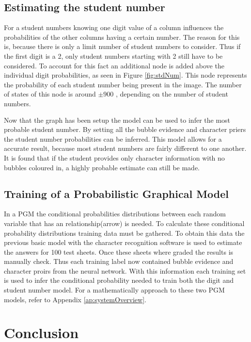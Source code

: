 \subsection{Estimating the student number}
\label{sec:studentNumber}

For a student numbers knowing one digit value of a column influences the probabilities of the other columns having a certain number. The reason for this is, because there is only a limit number of student numbers to consider. Thus if the first digit is a 2, only student numbers starting with 2 still have to be considered. To account for this fact an additional node is added above the individual digit probabilities, as seen in Figure \ref{fig:stdNum}. This node represents the probability of each student number being present in the image. The number of states of this node is around $\pm 900$ , depending on the number of student numbers.

Now that the graph has been setup the model can be used to infer the most probable student number. By setting all the bubble evidence and character priers the student number probabilities can be inferred. This model allows for a accurate result, because most student numbers are fairly different to one another. It is found that if the student provides only character information with no bubbles coloured in, a highly probable estimate can still be made.

\subsection{Training of a Probabilistic Graphical Model}
In a PGM the conditional probabilities distributions between each random variable that has an relationship(arrow) is needed. 
To calculate these conditional probability distributions training data must be gathered. To obtain this  data the previous basic model with the character recognition software is used to estimate the answers for 100 test sheets. Once these sheets where graded the results is manually check. Thus each training label now contained bubble evidence and character proirs from the neural network. With this information each training set is used to infer the conditional probability needed to train both the digit and student number model. For a mathematically approach to these two PGM models, refer to Appendix \ref{ap:systemOverview}.

\section{Conclusion}


